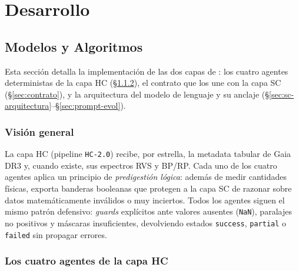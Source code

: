 \section{Desarrollo}
\label{sec:desarrollo}

\subsection{Modelos y Algoritmos}
\label{sec:modelos}

Esta sección detalla la implementación de las dos capas de \STELLAR{}: los cuatro
agentes deterministas de la capa HC (§\ref{sec:hc-agentes}), el contrato que los
une con la capa SC (§\ref{sec:contrato}), y la arquitectura del modelo de lenguaje
y su anclaje (§\ref{sec:sc-arquitectura}--§\ref{sec:prompt-evol}).

\subsubsection{Visión general}
\label{sec:hc-overview}

La capa HC (pipeline \texttt{HC-2.0}) recibe, por estrella, la metadata tabular de
Gaia DR3 y, cuando existe, sus espectros RVS y BP/RP. Cada uno de los cuatro
agentes aplica un principio de \emph{predigestión lógica}: además de medir
cantidades físicas, exporta banderas booleanas que protegen a la capa SC de razonar
sobre datos matemáticamente inválidos o muy inciertos. Todos los agentes siguen el
mismo patrón defensivo: \emph{guards} explícitos ante valores ausentes
(\texttt{NaN}), paralajes no positivos y máscaras insuficientes, devolviendo
estados \texttt{success}, \texttt{partial} o \texttt{failed} sin propagar errores.

\subsubsection{Los cuatro agentes de la capa HC}
\label{sec:hc-agentes}

